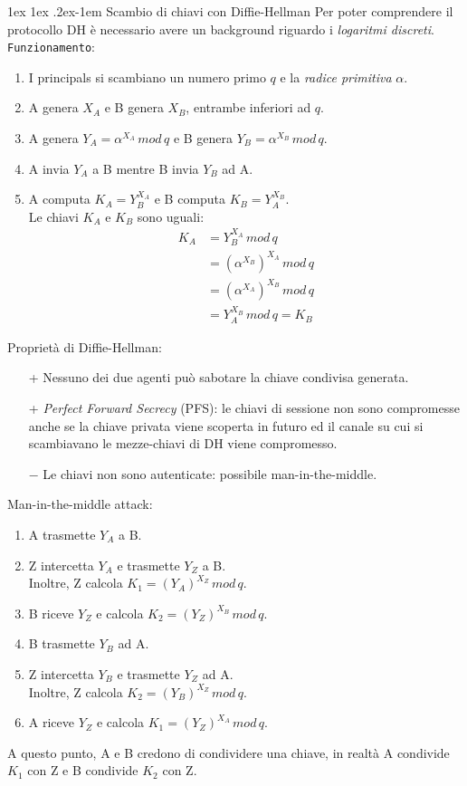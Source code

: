 \documentclass[a4paper, 11pt, twoside, openright, fleqn]{report}
\makeatletter
\renewcommand{\paragraph}{%
	\@startsection{paragraph}{4}%
	{\z@}{1ex \@plus 1ex \@minus .2ex}{-1em}%
	{\normalfont\normalsize\bfseries}%
}
\makeatother
\begin{document}
\paragraph{Scambio di chiavi con Diffie-Hellman}
Per poter comprendere il protocollo DH è necessario avere un background riguardo i \emph{logaritmi discreti}.\\
\texttt{Funzionamento}:
\begin{enumerate}
	\item I principals si scambiano un numero primo $q$ e la \emph{radice primitiva} $\alpha$.
	\item A genera $X_A$ e B genera $X_B$, entrambe inferiori ad $q$.
	\item A genera $Y_A = \alpha^{X_A}\,mod\,q$ e B genera $Y_B = \alpha^{X_B}\,mod\,q$.
	\item A invia $Y_A$ a B mentre B invia $Y_B$ ad A.
	\item A computa $K_A = Y_B^{X_A}$ e B computa $K_B=Y_A^{X_B}$.\\
	Le chiavi $K_A$ e $K_B$ sono uguali:
	\begin{align*}
		K_A &= Y_B^{X_A}\,mod\,q\\
		&= (\alpha^{X_B})^{X_A}\,mod\,q\\
		&= (\alpha^{X_A})^{X_B}\,mod\,q\\
		&= Y_A^{X_B}\,mod\,q = K_B
	\end{align*}
\end{enumerate}
Proprietà di Diffie-Hellman:
\begin{itemize}
	\item[+] Nessuno dei due agenti può sabotare la chiave condivisa generata.
	\item[+] \emph{Perfect Forward Secrecy} (PFS): le chiavi di sessione non sono compromesse anche se la chiave privata viene scoperta in futuro ed il canale su cui si scambiavano le mezze-chiavi di DH viene compromesso.
	\item[$-$] Le chiavi non sono autenticate: possibile man-in-the-middle.
\end{itemize}
Man-in-the-middle attack:
\begin{enumerate}
	\item A trasmette $Y_A$ a B.
	\item Z intercetta $Y_A$ e trasmette $Y_Z$ a B.\\
	Inoltre, Z calcola $K_1 = (Y_A)^{X_Z}\,mod\,q$.
	\item B riceve $Y_Z$ e calcola $K_2 = (Y_Z)^{X_B}\,mod\,q$.
	\item B trasmette $Y_B$ ad A.
	\item Z intercetta $Y_B$ e trasmette $Y_Z$ ad A.\\
	Inoltre, Z calcola $K_2 = (Y_B)^{X_Z}\,mod\,q$.
	\item A riceve $Y_Z$ e calcola $K_1 = (Y_Z)^{X_A}\,mod\,q$.	
\end{enumerate}
A questo punto, A e B credono di condividere una chiave, in realtà A condivide $K_1$ con Z e B condivide $K_2$ con Z.
\end{document}

